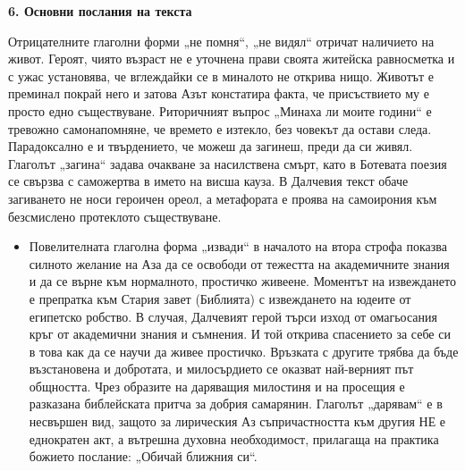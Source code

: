 \documentclass[12pt,a4paper]{article}
\begin{document}
\vspace{0.1cm}
 
\noindent 
\textbf{6. Основни послания на текста}
\vspace{0.1cm}
 
\indent Отрицателните глаголни форми „не помня“, „не видял“ отричат наличието на живот. Героят, чиято възраст не е уточнена прави своята житейска равносметка и с ужас установява, че вглеждайки се в миналото не открива нищо. Животът е преминал покрай него и затова Азът констатира факта, че присъствието му е просто едно съществуване. Риторичният въпрос „Минаха ли моите години“ е тревожно самонапомняне, че времето е изтекло, без човекът да остави следа. Парадоксално е и твърдението, че можеш да загинеш, преди да си живял. Глаголът „загина“ задава очакване за насилствена смърт, като в Ботевата поезия се свързва с саможертва в името на висша кауза. В Далчевия текст обаче загиването не носи героичен ореол, а метафората е проява на самоирония към безсмислено протеклото съществуване.

\begin{itemize}[leftmargin=*]
\vspace{-0.2cm}
\item Повелителната глаголна форма „извади“ в началото на втора строфа показва силното желание на Аза да се освободи от тежестта на академичните знания и да се върне към нормалното, простичко живеене. Моментът на извеждането е препратка към Стария завет (Библията) с извеждането на юдеите от египетско робство. В случая, Далчевият герой търси изход от омагьосания кръг от академични знания и съмнения. И той открива спасението за себе си в това как да се научи да живее простичко. Връзката с другите трябва да бъде възстановена и добротата, и милосърдието се оказват най-верният път общността.  Чрез образите на даряващия милостиня и на просещия е разказана библейската притча за добрия самарянин. Глаголът „дарявам“ е в несвършен вид, защото за лирическия Аз съпричастността към другия НЕ е еднократен акт, а вътрешна духовна необходимост, прилагаща на практика божието послание: „Обичай ближния си“. 
\end{itemize}
 
\end{document}

